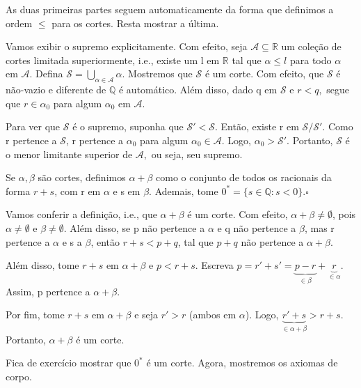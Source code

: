 \documentclass[Analysis/analysis_notes.tex]{subfiles}
\begin{document}
\begin{proof*}
	As duas primeiras partes seguem automaticamente da forma que definimos a ordem $\leq{}$ para os cortes. Resta mostrar a \'ultima.

	Vamos exibir o supremo explicitamente. Com efeito, seja $\mathcal{A}\subseteq{\mathbb{R}}$ um cole\c c\~ao de cortes
	limitada superiormente, i.e., existe um l em $\mathbb{R}$ tal que $\alpha \leq{l}$ para todo $\alpha$ em $\mathcal{A}.$
	Defina $\mathcal{S} = \bigcup_{\alpha\in \mathcal{A}}\alpha$. Mostremos que $\mathcal{S}$ \'e um corte. Com efeito,
	que $\mathcal{S}$ \'e n\~ao-vazio e diferente de $\mathbb{Q}$ \'e autom\'atico. Al\'em disso, dado q em $\mathcal{S}$ e $r < q,$
	segue que $r\in \alpha_{0}$ para algum $\alpha_{0}$ em $\mathcal{A}.$

	Para ver que $\mathcal{S}$ \'e o supremo, suponha que $\mathcal{S}' < \mathcal{S}.$ Ent\~ao, existe r em $\mathcal{S}/\mathcal{S}'$.
	Como r pertence a $\mathcal{S}$, r pertence a $\alpha_{0}$ para algum $\alpha_{0}\in \mathcal{A}.$ Logo, $\alpha_{0} > \mathcal{S}'.$ Portanto,
	$\mathcal{S}$ \'e o menor limitante superior de $\mathcal{A},$ ou seja, seu supremo. \qedsymbol
\end{proof*}
\begin{def*}
	Se $\alpha, \beta$ s\~ao cortes, definimos $\alpha + \beta$ como o conjunto de todos os racionais da forma $r + s$, com r em $\alpha$
	e s em $\beta$. Ademais, tome $0^* = \{s\in \mathbb{Q}: s < 0\}.\square$
\end{def*}
Vamos conferir a defini\c c\~ao, i.e., que $\alpha + \beta$ \'e um corte. Com efeito, $\alpha + \beta\neq\emptyset$, pois $\alpha\neq\emptyset$
e $\beta\neq\emptyset$. Al\'em disso, se p n\~ao pertence a $\alpha$ e q n\~ao pertence a $\beta$, mas r pertence a $\alpha$ e s a $\beta$,
ent\~ao $r + s < p + q$, tal que $p + q$ n\~ao pertence a $\alpha + \beta.$

Al\'em disso, tome $r + s$ em $\alpha + \beta$ e $p < r + s$. Escreva $p = r' + s' = \underbrace{p - r}_{\in \beta} + \underbrace{r}_{\in \alpha}.$ Assim,
p pertence a $\alpha + \beta.$

Por fim, tome $r + s$ em $\alpha + \beta$ e seja $r' > r$ (ambos em $\alpha$). Logo, $\underbrace{r' + s}_{\in \alpha + \beta} > r + s$. Portanto,
$\alpha + \beta$ \'e um corte.

Fica de exerc\'icio mostrar que $0^*$ \'e um corte. Agora, mostremos os axiomas de corpo.
\end{document}
